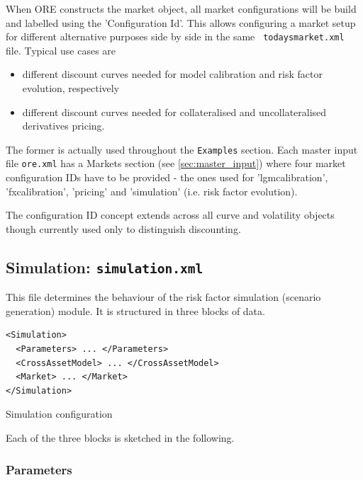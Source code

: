 \documentclass[12pt, a4paper]{article}
\begin{document}
{When ORE constructs the market object, all market configurations will be build and labelled using the 'Configuration
Id'.  This allows configuring a market setup for different alternative purposes side by side in the same {\tt
  todaysmarket.xml} file. Typical use cases are
\begin{itemize}
\item different discount curves needed for model calibration and risk factor evolution, respectively
\item different discount curves needed for collateralised and uncollateralised derivatives pricing.
\end{itemize}
The former is actually used throughout the {\tt Examples} section. Each master input file {\tt ore.xml} has a Markets
section (see \ref{sec:master_input}) where four market configuration IDs have to be provided - the ones used for
'lgmcalibration', 'fxcalibration', 'pricing' and 'simulation' (i.e. risk factor evolution).

\medskip The configuration ID concept extends across all curve and volatility objects though currently used only to
distinguish discounting.



\subsection{Simulation: {\tt simulation.xml}}\label{sec:simulation}

This file determines the behaviour of the risk factor simulation (scenario generation) module.
It is structured in three blocks of data.

\begin{listing}[H]
\begin{verbatim}
<Simulation>
  <Parameters> ... </Parameters>
  <CrossAssetModel> ... </CrossAssetModel>
  <Market> ... </Market>
</Simulation>
\end{verbatim}
\caption{Simulation configuration}
\label{lst:simulation_configuration}
\end{listing}

Each of the three blocks is sketched in the following.

\subsubsection{Parameters}\label{sec:sim_params}

}
\end{document}
